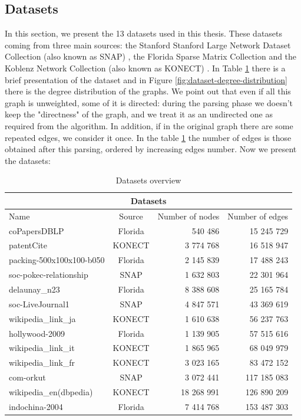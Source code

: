 \subsection{Datasets}\label{Dataset}
In this section, we present the 13 datasets used in this thesis. These datasets coming from three main sources: the Stanford Stanford Large Network Dataset Collection (also known as SNAP) \cite{snap}, the Florida Sparse Matrix Collection \cite{florida-matrix} and the Koblenz Network Collection (also known as KONECT)  \cite{konect}. In Table \ref{tab:dataset} there is a brief presentation of the dataset and in Figure \ref{fig:dataset-degree-distribution} there is the degree distribution of the graphs.  We point out that even if all this graph is unweighted, some of it is directed: during the parsing phase we doesn't keep the "directness" of the graph, and we treat it as an undirected one as required from the algorithm. In addition, if in the original graph there are some repeated edges, we consider it once. In the table \ref{tab:dataset} the number of edges is those obtained after this parsing, ordered by increasing edges number. Now we present the datasets: 
\begin{table}
	\centering
	\begin{tabular}{ |l||c||r|r|}
		\hline
		\multicolumn{4}{|c|}{Datasets} \\
		\hline
		Name& Source &  Number of nodes  & Number of edges\\
		\hline
		coPapersDBLP & Florida  & 540 486    & 15 245 729\\
		patentCite & KONECT &3 774 768 & 16 518 947 \\
		packing-500x100x100-b050 & Florida & 2 145 839 & 17 488 243 \\
		soc-pokec-relationship & SNAP &1 632 803 & 22 301 964 \\ 
		delaunay\_n23 & Florida &8 388 608 & 25 165 784\\
		soc-LiveJournal1 & SNAP & 4 847 571 & 43 369 619 \\
		wikipedia\_link\_ja & KONECT & 1 610 638 & 56 237 763\\
		hollywood-2009 & Florida &1 139 905 & 57 515 616 \\
		wikipedia\_link\_it & KONECT & 1 865 965 & 68 049 979\\
		wikipedia\_link\_fr & KONECT & 3 023 165 & 83 472 152\\
		com-orkut & SNAP &3 072 441 &117 185 083\\
		wikipedia\_en(dbpedia) & KONECT & 18 268 991 & 126 890 209 \\
		indochina-2004 & Florida & 7 414 768 & 153 487 303 \\
		\hline
	\end{tabular}
	\caption{\label{tab:dataset}Datasets overview}
\end{table} 
